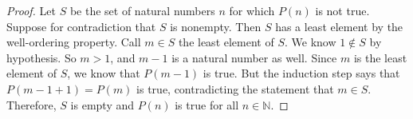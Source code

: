 \documentclass[../main.tex]{subfiles}
\begin{document}
\begin{proof}
Let \( S \) be the set of natural numbers \( n \) for which \( P(n) \) is not true. Suppose for contradiction that \( S \) is nonempty. Then \( S \) has a least element by the well-ordering property. Call \( m \in S \) the least element of \( S \). We know \( 1 \notin S \) by hypothesis. So \( m > 1 \), and \( m-1 \) is a natural number as well. Since \( m \) is the least element of \( S \), we know that \( P(m-1) \) is true. But the induction step says that \( P(m-1+1) = P(m) \) is true, contradicting the statement that \( m \in S \). Therefore, \( S \) is empty and \( P(n) \) is true for all \( n \in \mathbb{N} \).
 
\end{proof}
\end{document}
